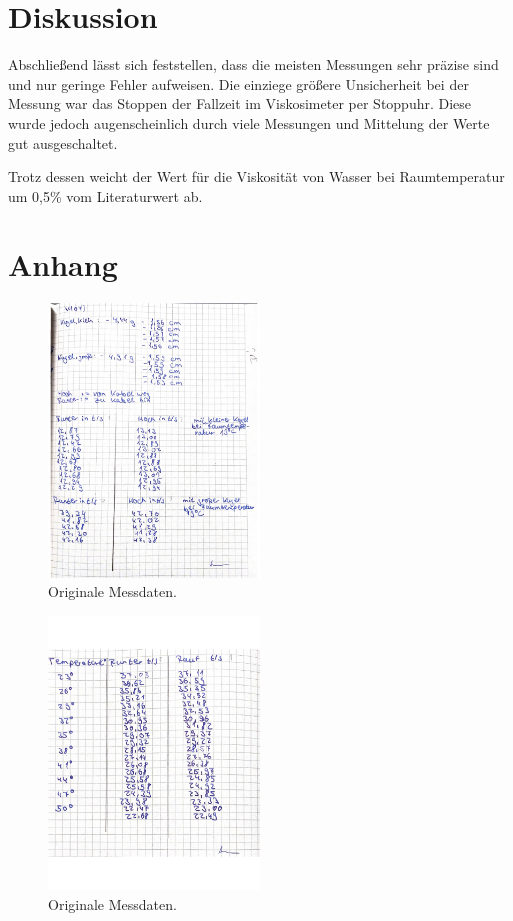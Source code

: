 \section{Diskussion}
\label{sec:Diskussion}
Abschließend lässt sich feststellen, dass die meisten Messungen sehr präzise sind und nur geringe Fehler aufweisen. Die einziege größere Unsicherheit bei der Messung war das
Stoppen der Fallzeit im Viskosimeter per Stoppuhr. Diese wurde jedoch augenscheinlich durch viele Messungen und Mittelung der Werte gut ausgeschaltet.

Trotz dessen weicht der Wert für die Viskosität von Wasser bei Raumtemperatur um 0,5\% vom Literaturwert ab.


\section{Anhang}
\label{sec:Anhang}

\begin{figure}[H]
    \centering
    \includegraphics[width=0.5\textwidth]{Dateien/V107daten1.jpg}
    \caption{Originale Messdaten.}
    \label{fig:origDaten1}
\end{figure}
\begin{figure}[H]
    \centering
    \includegraphics[width=0.5\textwidth]{Dateien/V107daten2.jpg}
    \caption{Originale Messdaten.}
    \label{fig:origDaten2}
\end{figure}